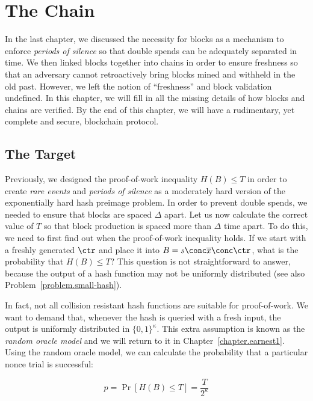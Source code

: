 \chapter{The Chain}\label{chapter.chain}

In the last chapter, we discussed the necessity for blocks as a mechanism to enforce \emph{periods of silence} so that double spends
can be adequately separated in time.  We then linked blocks together into chains in order to ensure freshness so that an adversary cannot
retroactively bring blocks mined and withheld in the old past. However, we left the notion of ``freshness'' and block validation
undefined. In this chapter, we will fill in all the missing details of how blocks and chains are verified. By the end of this chapter,
we will have a rudimentary, yet complete and secure, blockchain protocol.

\section{The Target}

Previously, we designed the proof-of-work inequality $H(B) \leq T$ in order to create \emph{rare events} and \emph{periods of silence}
as a moderately hard version of the exponentially hard hash preimage problem. In order to prevent double spends, we needed to ensure
that blocks are spaced $\Delta$ apart. Let us now calculate the correct value of $T$ so that block production is spaced more than
$\Delta$ time apart. To do this, we need to first find out when the proof-of-work inequality holds. If we start
with a freshly generated $\ctr$ and place it into $B = s \conc \overline{x} \conc \ctr$, what is the probability that $H(B) \leq T$?
This question is not straightforward to answer, because the output of a hash function may not be uniformly distributed (see also
Problem~\ref{problem.small-hash}).

In fact, not all collision resistant hash functions are suitable for proof-of-work. We want to demand that, whenever the hash is queried with a fresh input, the output is uniformly distributed in $\{0,1\}^\kappa$. This extra assumption is known as the \emph{random oracle model} and we will return to it in Chapter~\ref{chapter.earnest1}. Using the random oracle model, we can calculate the probability that a particular nonce trial is successful:

\[
  p = \Pr[H(B) \leq T] = \frac{T}{2^\kappa}
\]

